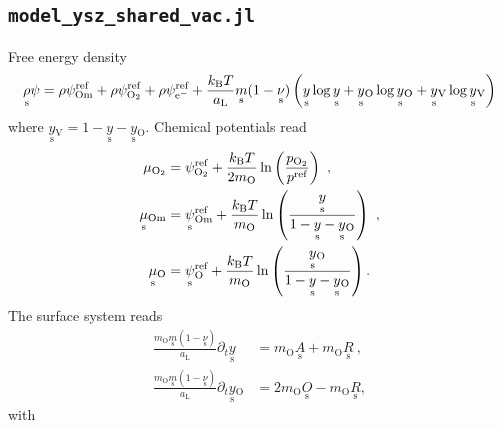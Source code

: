 \documentclass{article}
\numberwithin{equation}{section}
\newcommand{\us}[1]{\underset{\textrm{s}}{#1}{}}
\def\kB{k_\mathrm{B}}
\def\Ox{\mathrm{O}}
\def\Om{\mathrm{Om}}
\newcommand{\OO}{{\ce{O2}}}
\def\eM{\mathrm{e^-}}
\def\aL{a_\mathrm{L}}
\def\ys{\us y}
\newcommand{\ysV}{\us y_{\textrm{V}}}
\def\yOs{\us y_\textrm{O}}
\def\REF{\textrm{ref}}
\begin{document}
\subsection{\texttt{model\_ysz\_shared\_vac.jl}}
Free energy density
\begin{align}
    \us\rho\psi = 
              \rho\psi^\REF_\Om
            + \rho\psi^\REF_\OO
            + \rho\psi^\REF_\eM
            + \frac{\kB T}{\aL}\us m(1-\us\nu) 
            \left( 
                \ys   \log {\ys} 
                +\yOs  \log {\yOs}
                +\ysV  \log {\ysV}
            \right)
    \label{}
\end{align}
where $\ysV = 1 - \ys - \yOs$.
Chemical potentials read
\begin{subequations}
\begin{align}
\mu_{\OO} &= \psi_{\OO}^\REF + \frac{\kB T}{2 m_\Ox}\ln 
\left( 
    \frac{p_\OO}{p^\REF} 
\right)~,
\\
\us\mu_{\Om} 
&= 
\us \psi_{\Om}^\REF 
+ 
\frac{\kB T}{m_\Ox} \ln 
\left(  
	\frac{\ys}{1-\ys - \yOs}
\right)~,
\\
\us\mu_{\Ox} 
&= 
\us \psi_{\Ox}^\REF 
+ 
\frac{\kB T}{m_\Ox} \ln 
\left(  
	\frac{\yOs}{1-\ys - \yOs}
\right).
\end{align}
\end{subequations}
The surface system reads
\begin{subequations}
\begin{align}
 \frac{m_\Ox \us m (1- \us \nu)}{\aL}\partial_t \ys
&=
m_\Ox \us A
+
m_\Ox \us R~,
\\
 \frac{m_\Ox \us m (1- \us \nu)}{\aL}\partial_t \yOs
&=
2 m_\Ox \us O
-
m_\Ox \us R,
\end{align}
\end{subequations}
with
\end{document}
